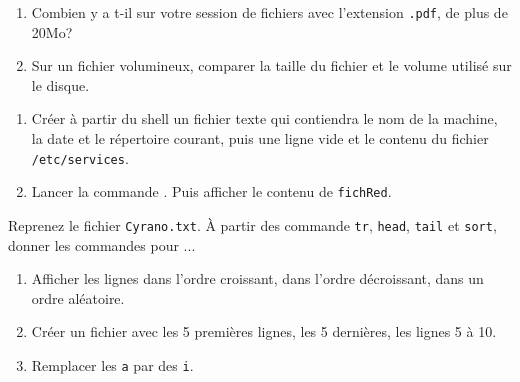 \documentclass[a4paper,11pt]{exam}
\begin{document}
{\begin{enumerate}
	\item Combien y a t-il sur votre session de fichiers avec l'extension \texttt{.pdf}, de plus de 20Mo?
      \item Sur un fichier volumineux, comparer la taille du fichier et le volume utilisé sur le disque.
      \end{enumerate}
}


{
\begin{enumerate}
 \item Créer à partir du shell un fichier texte qui contiendra le nom de la machine, la date et le répertoire courant, puis une ligne vide et le contenu du fichier \texttt{/etc/services}.
 \item Lancer la commande   . Puis afficher le contenu de \texttt{fichRed}.
\end{enumerate}

 	

}

{
	Reprenez le fichier \texttt{Cyrano.txt}. À partir des commande \texttt{tr}, \texttt{head}, \texttt{tail} et \texttt{sort}, donner les commandes pour ...
	\begin{enumerate}
	\item Afficher les lignes dans l'ordre croissant, dans l'ordre décroissant, dans un ordre aléatoire.
	\item Créer un fichier avec les 5 premières lignes, les 5 dernières, les lignes 5 à 10.
	\item Remplacer les \texttt{a} par des \texttt{i}.
	\end{enumerate}
}
\end{document}
